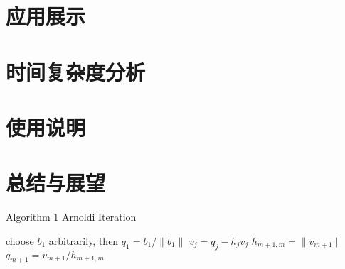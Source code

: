 \documentclass{source/Report}
\begin{document}
    \section{应用展示}

    \section{时间复杂度分析}

    \section{使用说明}

    \section{总结与展望}
    \begin{algorithm}
        \caption{Algorithm 1 Arnoldi Iteration}
        \begin{algorithmic}[1]
        \State choose $b_1$ arbitrarily, then $q_1 = b_1/\|b_1\|$
            \State $v_j = q_j - h_jv_j$
          \EndFor
          \State $h_{m+1,m} = \|v_{m+1}\|$
          \State $q_{m+1} = v_{m+1}/h_{m+1,m}$
        \EndFor
        \end{algorithmic}
        \end{algorithm}
        
        
    
    
        
\end{document}
